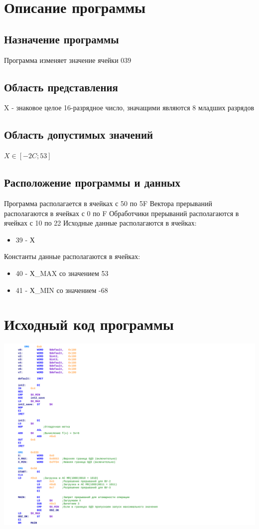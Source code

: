 \documentclass[12pt]{article}
\begin{document}
	\section{Описание программы}
	\subsection{Назначение программы}
	Программа изменяет значение ячейки $ 039 $
	
	\subsection{Область представления}
	X - знаковое целое 16-разрядное число, значащими являются 8 младших разрядов
	
	\subsection{Область допустимых значений}
	
	$ X \in \left[-2C;53\right] $
	
	\subsection{Расположение программы и данных}
	Программа располагается в ячейках с 50 по 5F
	Вектора прерываний располагаются в ячейках с 0 по F
	Обработчики прерываний располагаются в ячейках с 10 по 22
	Исходные данные располагаются в ячейках:
	\begin{itemize}
		\item 39 - Х
	\end{itemize}
	Константы данные располагаются в ячейках:
	\begin{itemize}
		\item 40 - Х_MAX со значением 53
		\item 41 - Х_MIN со значением -68
	\end{itemize}
	\newpage
	
	\section{Исходный код программы}
	\includegraphics{colored_code.pdf}
	\newpage
	
\end{document}
